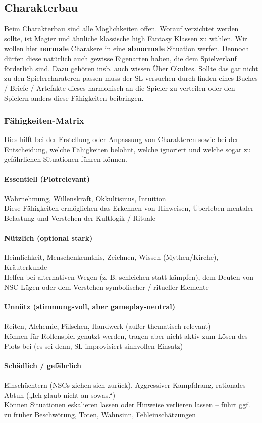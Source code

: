 \subsection{Charakterbau}
Beim Charakterbau sind alle Möglichkeiten offen. Worauf verzichtet werden sollte, ist Magier und ähnliche klassische high Fantasy Klassen zu wählen. Wir wollen hier \textbf{normale} Charakere in eine \textbf{abnormale} Situation werfen. Dennoch dürfen diese natürlich auch gewisse Eigenarten haben, die dem Spielverlauf förderlich sind. Dazu gehören insb. auch wissen Über Okultes. Sollte das gar nicht zu den Spielercharateren passen muss der SL versuchen durch finden eines Buches / Briefe / Artefakte dieses harmonisch an die Spieler zu verteilen oder den Spielern anders diese Fähigkeiten beibringen.
\subsubsection*{Fähigkeiten-Matrix}
Dies hilft bei der Erstellung oder Anpassung von Charakteren sowie bei der Entscheidung, welche Fähigkeiten belohnt, welche ignoriert und welche sogar zu gefährlichen Situationen führen können.
\paragraph{Essentiell (Plotrelevant)}
Wahrnehmung, Willenskraft, Okkultismus, Intuition\\
Diese Fähigkeiten ermöglichen das Erkennen von Hinweisen, Überleben mentaler Belastung und Verstehen der Kultlogik / Rituale
\paragraph{Nützlich (optional stark)}
Heimlichkeit, Menschenkenntnis, Zeichnen, Wissen (Mythen/Kirche), Kräuterkunde\\
Helfen bei alternativen Wegen (z. B. schleichen statt kämpfen), dem Deuten von NSC-Lügen oder dem Verstehen symbolischer / ritueller Elemente
\paragraph{Unnütz (stimmungsvoll, aber gameplay-neutral)}
Reiten, Alchemie, Fälschen, Handwerk (außer thematisch relevant)\\
Können für Rollenspiel genutzt werden, tragen aber nicht aktiv zum Lösen des Plots bei (es sei denn, SL improvisiert sinnvollen Einsatz)
\paragraph{Schädlich / gefährlich}
Einschüchtern (NSCs ziehen sich zurück), Aggressiver Kampfdrang, rationales Abtun („Ich glaub nicht an sowas.“)\\
Können Situationen eskalieren lassen oder Hinweise verlieren lassen – führt ggf. zu früher Beschwörung, Toten, Wahnsinn, Fehleinschätzungen

